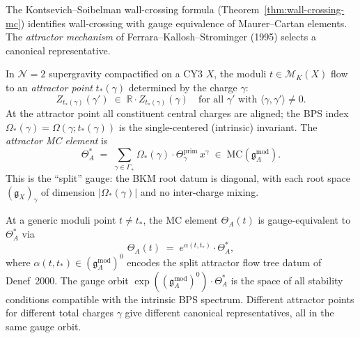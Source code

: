 The Kontsevich--Soibelman wall-crossing formula (Theorem~\ref{thm:wall-crossing-mc}) identifies wall-crossing with gauge equivalence of Maurer--Cartan elements. The \emph{attractor mechanism} of Ferrara--Kallosh--Strominger (1995) selects a canonical representative.

\begin{definition}
\label{def:phys-attractor-mc}
In $\mathcal{N}=2$ supergravity compactified on a CY3 $X$, the moduli $t \in \mathcal{M}_K(X)$ flow to an \emph{attractor point} $t_*(\gamma)$ determined by the charge $\gamma$:
\begin{equation}\label{eq:phys-attractor-alignment}
Z_{t_*(\gamma)}(\gamma') \;\in\; \mathbb{R} \cdot Z_{t_*(\gamma)}(\gamma)
\quad \text{for all } \gamma' \text{ with } \langle \gamma, \gamma' \rangle \neq 0.
\end{equation}
At the attractor point all constituent central charges are aligned; the BPS index $\Omega_*(\gamma) = \Omega(\gamma; t_*(\gamma))$ is the single-centered (intrinsic) invariant. The \emph{attractor MC element} is
\begin{equation}\label{eq:phys-attractor-mc}
\Theta_A^* \;=\; \sum_{\gamma \in \Gamma_+} \Omega_*(\gamma) \cdot \Theta_\gamma^{\mathrm{prim}}\, x^\gamma
\;\in\; \mathrm{MC}(\mathfrak{g}^{\mathrm{mod}}_A).
\end{equation}
This is the ``split'' gauge: the BKM root datum is diagonal, with each root space $(\mathfrak{g}_X)_\gamma$ of dimension $|\Omega_*(\gamma)|$ and no inter-charge mixing.
\end{definition}

\begin{proposition}[Attractor = canonical gauge representative]
\label{prop:phys-attractor-canonical}
At a generic moduli point $t \neq t_*$, the MC element $\Theta_A(t)$ is gauge-equivalent to $\Theta_A^*$ via
\begin{equation}\label{eq:phys-binding-gauge}
\Theta_A(t) \;=\; e^{\alpha(t, t_*)} \cdot \Theta_A^*,
\end{equation}
where $\alpha(t, t_*) \in (\mathfrak{g}^{\mathrm{mod}}_A)^0$ encodes the split attractor flow tree datum of Denef~2000. The gauge orbit $\exp((\mathfrak{g}^{\mathrm{mod}}_A)^0) \cdot \Theta_A^*$ is the space of all stability conditions compatible with the intrinsic BPS spectrum. Different attractor points for different total charges $\gamma$ give different canonical representatives, all in the same gauge orbit.
\end{proposition}

